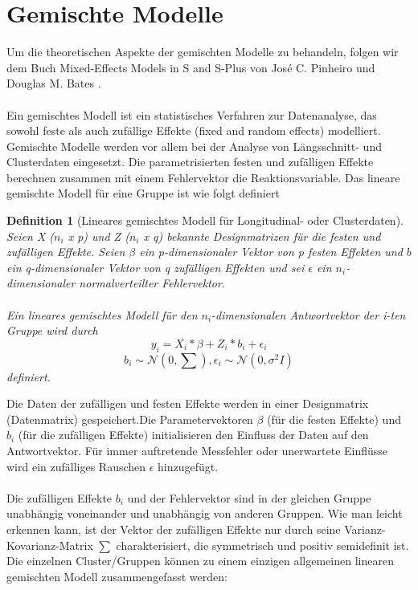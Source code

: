 \documentclass[%
thesis=student,%
coverpage=false,%
titlepage=false,%
headmarks=true, %
german,%
font=libertine, %
math=newpxtx, %
BCOR=5mm,%
coverBCOR=11mm%
]{tumbook}
\theoremstyle{break}
\newtheorem{definition}{Definition}[section]
\begin{document}
\section{Gemischte Modelle}
Um die theoretischen Aspekte der gemischten Modelle zu behandeln, folgen wir dem Buch \cite{pinheiro2000} Mixed-Effects Models in S and S-Plus von José C. Pinheiro und Douglas M. Bates \cite{pinheiro2000}.\\
\\
Ein gemischtes Modell ist ein statistisches Verfahren zur Datenanalyse, das sowohl feste als auch zufällige Effekte (fixed and random effects) modelliert. Gemischte Modelle werden vor allem bei der Analyse von Längsschnitt- und Clusterdaten eingesetzt.
Die parametrisierten festen und zufälligen Effekte berechnen zusammen mit einem Fehlervektor die Reaktionsvariable. Das lineare gemischte Modell für eine Gruppe ist wie folgt definiert
\begin{definition}[Lineares gemischtes Modell für Longitudinal- oder Clusterdaten] 
	Seien X ($n_i$ x p) und Z ($n_i$ x q) bekannte Designmatrizen für die festen und zufälligen Effekte. Seien $\beta$ ein p-dimensionaler Vektor von p festen Effekten und $b$ ein q-dimensionaler Vektor von q zufälligen Effekten und sei $\epsilon$ ein $n_i$-dimensionaler normalverteilter Fehlervektor.\\
	\\
	Ein lineares gemischtes Modell für den $n_i$-dimensionalen Antwortvektor der i-ten Gruppe wird durch 
	$$y_i = X_i * \beta + Z_i * b_i + \epsilon_i$$ 
	$$b_i \sim \mathcal{N}(0,\sum), \epsilon_i \sim \mathcal{N}(0,\sigma^2I)$$
	definiert.
\end{definition}\noindent
Die Daten der zufälligen und festen Effekte werden in einer Designmatrix (Datenmatrix) gespeichert.Die Parametervektoren $\beta$ (für die festen Effekte) und $b_i$ (für die zufälligen Effekte) initialisieren den Einfluss der Daten auf den Antwortvektor. Für immer auftretende Messfehler oder unerwartete Einflüsse wird ein zufälliges Rauschen $\epsilon$ hinzugefügt.\\
\\
Die zufälligen Effekte $b_i$ und der Fehlervektor sind in der gleichen Gruppe unabhängig voneinander und unabhängig von anderen Gruppen. Wie man leicht erkennen kann, ist der Vektor der zufälligen Effekte nur durch seine Varianz-Kovarianz-Matrix $\sum$ charakterisiert, die symmetrisch und positiv semidefinit ist.
\\
Die einzelnen Cluster/Gruppen können zu einem einzigen allgemeinen linearen gemischten Modell zusammengefasst werden:
\end{document}
